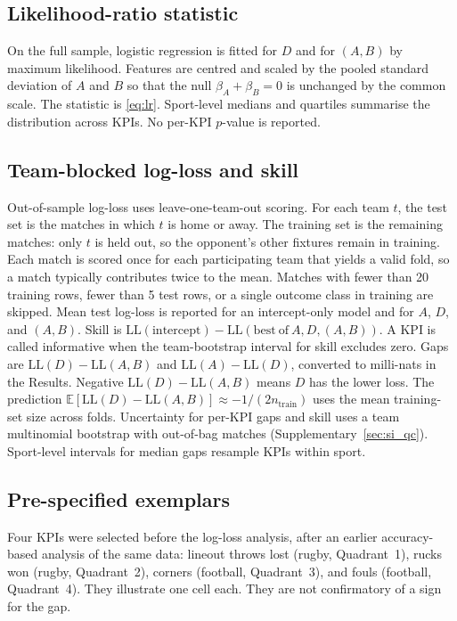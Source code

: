 \subsection{Likelihood-ratio statistic}

On the full sample, logistic regression is fitted for $D$ and for $(A,B)$ by maximum likelihood.
Features are centred and scaled by the pooled standard deviation of $A$ and $B$ so that the null $\beta_A+\beta_B=0$ is unchanged by the common scale.
The statistic is \cref{eq:lr}.
Sport-level medians and quartiles summarise the distribution across KPIs.
No per-KPI $p$-value is reported.

\subsection{Team-blocked log-loss and skill}
\label{sec:ml_cv}

Out-of-sample log-loss uses leave-one-team-out scoring.
For each team $t$, the test set is the matches in which $t$ is home or away.
The training set is the remaining matches: only $t$ is held out, so the opponent's other fixtures remain in training.
Each match is scored once for each participating team that yields a valid fold, so a match typically contributes twice to the mean.
Matches with fewer than 20 training rows, fewer than 5 test rows, or a single outcome class in training are skipped.
Mean test log-loss is reported for an intercept-only model and for $A$, $D$, and $(A,B)$.
Skill is $\mathrm{LL}(\mathrm{intercept})-\mathrm{LL}(\mathrm{best\ of\ }A,D,(A,B))$.
A KPI is called informative when the team-bootstrap interval for skill excludes zero.
Gaps are $\mathrm{LL}(D)-\mathrm{LL}(A,B)$ and $\mathrm{LL}(A)-\mathrm{LL}(D)$, converted to milli-nats in the Results.
Negative $\mathrm{LL}(D)-\mathrm{LL}(A,B)$ means $D$ has the lower loss.
The prediction $\mathbb{E}[\mathrm{LL}(D)-\mathrm{LL}(A,B)]\approx -1/(2n_{\mathrm{train}})$ uses the mean training-set size across folds.
Uncertainty for per-KPI gaps and skill uses a team multinomial bootstrap with out-of-bag matches (Supplementary~\cref{sec:si_qc}).
Sport-level intervals for median gaps resample KPIs within sport.

\subsection{Pre-specified exemplars}

Four KPIs were selected before the log-loss analysis, after an earlier accuracy-based analysis of the same data: lineout throws lost (rugby, Quadrant~1), rucks won (rugby, Quadrant~2), corners (football, Quadrant~3), and fouls (football, Quadrant~4).
They illustrate one cell each.
They are not confirmatory of a sign for the gap.

